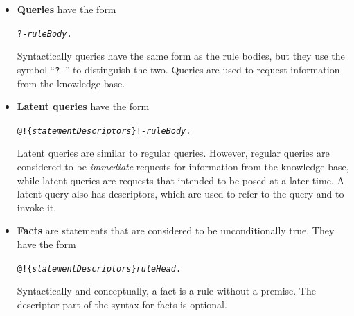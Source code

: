 \documentclass[11pt]{article}
\begin{document}
\begin{itemize}
  The statement descriptor part
  (\texttt{@!\{...\}})  is optional. The body of a rule is sometimes also
  called a \emph{premise}. 
\item \textbf{Queries} have the form\\
\begin{alltt}
     ?- \emph{ruleBody}.
\end{alltt}
  Syntactically queries have the same form as the rule bodies, but they use
  the symbol ``\texttt{?-}''  to distinguish the two. Queries are
  used to request information from the knowledge base.
\item \textbf{Latent queries} have the form\\
\begin{alltt}
     @!\{\emph{statementDescriptors}\}  !- \emph{ruleBody}.
\end{alltt}
  Latent queries are similar to regular queries. However, regular
  queries are considered to be \emph{immediate} requests for information
  from the knowledge base, while latent queries are requests that intended to
  be posed at a later time.  A latent query also has descriptors, which are
  used to refer to the query and to invoke it.
\item \textbf{Facts} are statements that are considered to be
  unconditionally true. They have the form\\
\begin{alltt}
     @!\{\emph{statementDescriptors}\}  \emph{ruleHead}.
\end{alltt}
  Syntactically and conceptually, a fact is a rule without a premise.
  The descriptor part of the syntax for facts is optional.
\end{itemize}
\end{document}
